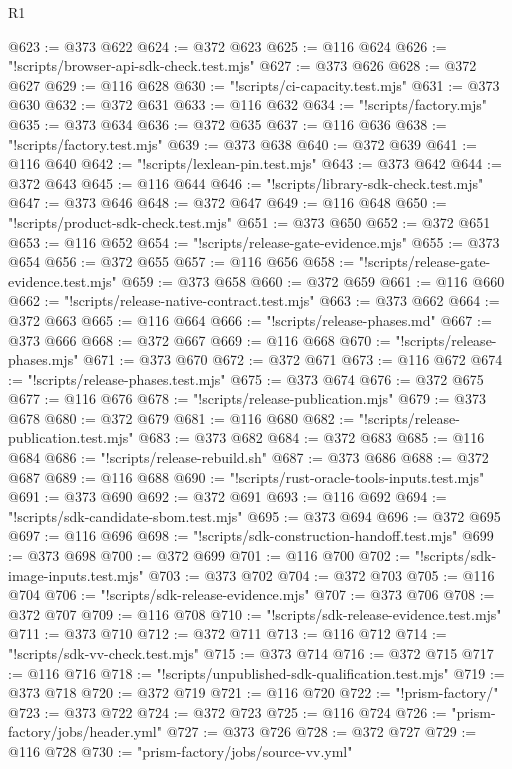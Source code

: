 \begin{lexlean}{R1}
\begin{coremodule}
@623 := @373 @622
@624 := @372 @623
@625 := @116 @624
@626 := "!scripts/browser-api-sdk-check.test.mjs"
@627 := @373 @626
@628 := @372 @627
@629 := @116 @628
@630 := "!scripts/ci-capacity.test.mjs"
@631 := @373 @630
@632 := @372 @631
@633 := @116 @632
@634 := "!scripts/factory.mjs"
@635 := @373 @634
@636 := @372 @635
@637 := @116 @636
@638 := "!scripts/factory.test.mjs"
@639 := @373 @638
@640 := @372 @639
@641 := @116 @640
@642 := "!scripts/lexlean-pin.test.mjs"
@643 := @373 @642
@644 := @372 @643
@645 := @116 @644
@646 := "!scripts/library-sdk-check.test.mjs"
@647 := @373 @646
@648 := @372 @647
@649 := @116 @648
@650 := "!scripts/product-sdk-check.test.mjs"
@651 := @373 @650
@652 := @372 @651
@653 := @116 @652
@654 := "!scripts/release-gate-evidence.mjs"
@655 := @373 @654
@656 := @372 @655
@657 := @116 @656
@658 := "!scripts/release-gate-evidence.test.mjs"
@659 := @373 @658
@660 := @372 @659
@661 := @116 @660
@662 := "!scripts/release-native-contract.test.mjs"
@663 := @373 @662
@664 := @372 @663
@665 := @116 @664
@666 := "!scripts/release-phases.md"
@667 := @373 @666
@668 := @372 @667
@669 := @116 @668
@670 := "!scripts/release-phases.mjs"
@671 := @373 @670
@672 := @372 @671
@673 := @116 @672
@674 := "!scripts/release-phases.test.mjs"
@675 := @373 @674
@676 := @372 @675
@677 := @116 @676
@678 := "!scripts/release-publication.mjs"
@679 := @373 @678
@680 := @372 @679
@681 := @116 @680
@682 := "!scripts/release-publication.test.mjs"
@683 := @373 @682
@684 := @372 @683
@685 := @116 @684
@686 := "!scripts/release-rebuild.sh"
@687 := @373 @686
@688 := @372 @687
@689 := @116 @688
@690 := "!scripts/rust-oracle-tools-inputs.test.mjs"
@691 := @373 @690
@692 := @372 @691
@693 := @116 @692
@694 := "!scripts/sdk-candidate-sbom.test.mjs"
@695 := @373 @694
@696 := @372 @695
@697 := @116 @696
@698 := "!scripts/sdk-construction-handoff.test.mjs"
@699 := @373 @698
@700 := @372 @699
@701 := @116 @700
@702 := "!scripts/sdk-image-inputs.test.mjs"
@703 := @373 @702
@704 := @372 @703
@705 := @116 @704
@706 := "!scripts/sdk-release-evidence.mjs"
@707 := @373 @706
@708 := @372 @707
@709 := @116 @708
@710 := "!scripts/sdk-release-evidence.test.mjs"
@711 := @373 @710
@712 := @372 @711
@713 := @116 @712
@714 := "!scripts/sdk-vv-check.test.mjs"
@715 := @373 @714
@716 := @372 @715
@717 := @116 @716
@718 := "!scripts/unpublished-sdk-qualification.test.mjs"
@719 := @373 @718
@720 := @372 @719
@721 := @116 @720
@722 := "!prism-factory/"
@723 := @373 @722
@724 := @372 @723
@725 := @116 @724
@726 := "prism-factory/jobs/header.yml"
@727 := @373 @726
@728 := @372 @727
@729 := @116 @728
@730 := "prism-factory/jobs/source-vv.yml"

\end{coremodule}
\end{lexlean}
